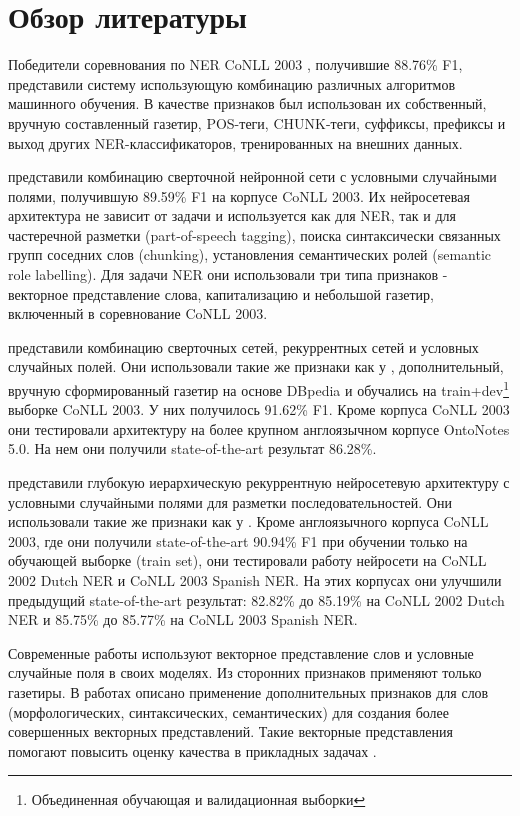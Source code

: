 \chapter{Обзор литературы}

Победители соревнования по NER CoNLL 2003 \citep{florian2003named}, получившие 88.76\% F1,
представили систему использующую комбинацию различных алгоритмов машинного обучения.
В качестве признаков был использован их собственный, вручную составленный газетир,
POS-теги, CHUNK-теги, суффиксы, префиксы и выход других NER-классификаторов,
тренированных на внешних данных.

\citep{collobert2011natural} представили комбинацию сверточной нейронной сети
с условными случайными полями, получившую 89.59\% F1 на корпусе CoNLL 2003.
Их нейросетевая архитектура не зависит от задачи и используется как для NER, так и для
частеречной разметки (part-of-speech tagging), поиска синтаксически связанных групп
соседних слов (chunking), установления семантических ролей (semantic role labelling).
Для задачи NER они использовали три типа признаков - векторное представление слова,
капитализацию и небольшой газетир, включенный в соревнование CoNLL 2003.

\citep{chiu2015named} представили комбинацию сверточных сетей, рекуррентных сетей
и условных случайных полей.
Они использовали такие же признаки как у \citep{collobert2011natural}, дополнительный, вручную сформированный
газетир на основе DBpedia и обучались на
train+dev\footnote{Объединенная обучающая и валидационная выборки} выборке CoNLL 2003.
У них получилось 91.62\% F1. Кроме корпуса CoNLL 2003 они тестировали архитектуру
на более крупном англоязычном корпусе OntoNotes 5.0. На нем они получили
state-of-the-art результат 86.28\%.

\citep{DBLP:journals/corr/YangSC16} представили глубокую иерархическую рекуррентную нейросетевую
архитектуру с условными случайными полями для разметки последовательностей.
Они использовали такие же признаки как у \citep{collobert2011natural}.
Кроме англоязычного корпуса CoNLL 2003, где они получили state-of-the-art 90.94\% F1 при обучении
только на обучающей выборке (train set), они тестировали работу нейросети на CoNLL 2002 Dutch NER и CoNLL 2003 Spanish NER.
На этих корпусах они улучшили предыдущий state-of-the-art результат:
82.82\% до 85.19\% на CoNLL 2002 Dutch NER и 85.75\% до 85.77\% на CoNLL 2003 Spanish NER.

Современные работы используют векторное представление слов
и условные случайные поля в своих моделях. Из сторонних признаков применяют
только газетиры. В работах \citep{xu2014rc, bian2014knowledge} описано применение дополнительных признаков для
слов (морфологических, синтаксических, семантических) для создания более
совершенных векторных представлений.
Такие векторные представления помогают повысить оценку качества в
прикладных задачах \citep{xu2014rc}.
